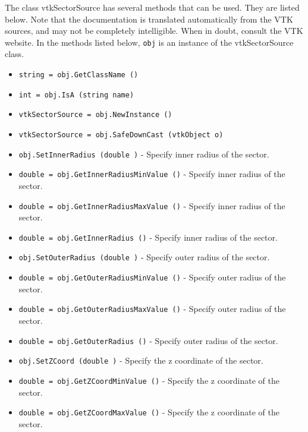 The class vtkSectorSource has several methods that can be used.
  They are listed below.
Note that the documentation is translated automatically from the VTK sources,
and may not be completely intelligible.  When in doubt, consult the VTK website.
In the methods listed below, \verb|obj| is an instance of the vtkSectorSource class.
\begin{itemize}
\item  \verb|string = obj.GetClassName ()|

\item  \verb|int = obj.IsA (string name)|

\item  \verb|vtkSectorSource = obj.NewInstance ()|

\item  \verb|vtkSectorSource = obj.SafeDownCast (vtkObject o)|

\item  \verb|obj.SetInnerRadius (double )| -  Specify inner radius of the sector.

\item  \verb|double = obj.GetInnerRadiusMinValue ()| -  Specify inner radius of the sector.

\item  \verb|double = obj.GetInnerRadiusMaxValue ()| -  Specify inner radius of the sector.

\item  \verb|double = obj.GetInnerRadius ()| -  Specify inner radius of the sector.

\item  \verb|obj.SetOuterRadius (double )| -  Specify outer radius of the sector.

\item  \verb|double = obj.GetOuterRadiusMinValue ()| -  Specify outer radius of the sector.

\item  \verb|double = obj.GetOuterRadiusMaxValue ()| -  Specify outer radius of the sector.

\item  \verb|double = obj.GetOuterRadius ()| -  Specify outer radius of the sector.

\item  \verb|obj.SetZCoord (double )| -  Specify the z coordinate of the sector.

\item  \verb|double = obj.GetZCoordMinValue ()| -  Specify the z coordinate of the sector.

\item  \verb|double = obj.GetZCoordMaxValue ()| -  Specify the z coordinate of the sector.


\end{itemize}

